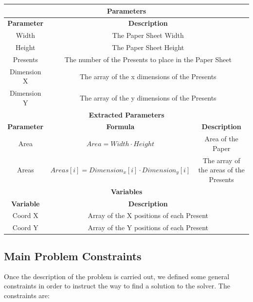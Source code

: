 \begin{center}
    \begin{adjustwidth}{-1.5cm}{}
        \begin{tabular}{|c|c|c|}
            \hline
            \multicolumn{3}{|c|}{\textbf{Parameters}} \\
            \hline
            \textbf{Parameter} & \multicolumn{2}{|c|}{\textbf{Description}} \\
            \hline
            Width & \multicolumn{2}{|c|}{The Paper Sheet Width} \\
            \hline
            Height & \multicolumn{2}{|c|}{The Paper Sheet Height} \\
            \hline
            Presents & \multicolumn{2}{|c|}{The number of the Presents to place in the Paper Sheet} \\
            \hline
            Dimension X & \multicolumn{2}{|c|}{The array of the x dimensions of the Presents} \\
            \hline
            Dimension Y & \multicolumn{2}{|c|}{The array of the y dimensions of the Presents} \\
            \hline
            \multicolumn{3}{|c|}{\textbf{Extracted Parameters}} \\
            \hline
            \textbf{Parameter} & \textbf{Formula} & \textbf{Description} \\
            \hline
            Area & $Area = Width \cdot Height$ & Area of the Paper \\
            \hline
            Areas & $Areas[i] = Dimension_x[i] \cdot Dimension_y[i]$ & The array of the areas of the Presents \\
            \hline
            \multicolumn{3}{|c|}{\textbf{Variables}} \\
            \hline
            \textbf{Variable} & \multicolumn{2}{|c|}{\textbf{Description}} \\
            \hline
            Coord X &  \multicolumn{2}{|c|}{Array of the X positions of each Present} \\
            \hline
            Coord Y &  \multicolumn{2}{|c|}{Array of the Y positions of each Present} \\
            \hline
        \end{tabular}
    \end{adjustwidth}
\end{center}


\subsection{Main Problem Constraints}
Once the description of the problem is carried out, we defined some general constraints
in order to instruct the way to find a solution to the solver. The constraints are:

